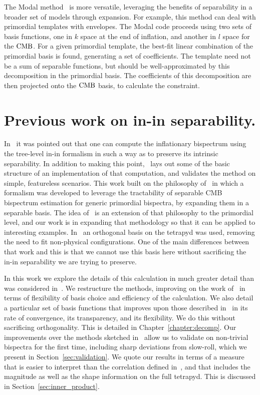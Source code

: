     The Modal method~\cite{FergShell_2014} is more versatile, 
    leveraging the benefits of separability in a broader set of models through expansion.
    For example, this method can deal with primordial templates with envelopes.
    The Modal code proceeds using two sets of basis functions, one in $k$ space at the end
    of inflation, and another in $l$ space for the $\text{CMB}$.
    For a given primordial template, the best-fit linear combination of the primordial basis
    is found, generating a set of coefficients.
    The template need not be a sum of separable functions, but should be well-approximated by this
    decomposition in the primordial basis.
    The coefficients of this decomposition are then projected onto the $\text{CMB}$ basis, to calculate the constraint.


\section{Previous work on in-in separability.}
    In~\cite{Funakoshi} it was pointed out that one can compute the inflationary
    bispectrum using the
tree-level in-in formalism in such a way as to preserve its intrinsic
separability. In addition to making this point,~\cite{Funakoshi} lays
out some of the basic structure of an implementation of that computation,
and validates the method on simple, featureless scenarios.
This work built on the philosophy of~\cite{FergShell_1,FergShell_2,FergShell_3}
in which a formalism was developed to
leverage the tractability of separable CMB bispectrum estimation
for generic primordial bispectra, by expanding them in a separable basis.
The idea of~\cite{Funakoshi} is an extension of that philosophy to the primordial level,
and our work is in expanding that methodology so that it can be applied
to interesting examples.
In~\cite{FergShell_1,FergShell_2,FergShell_3} an orthogonal basis on the tetrapyd was used,
removing the need to fit non-physical configurations.
One of the main differences between that work and this
is that we cannot use this basis here without sacrificing the
in-in separability we are trying to preserve.

In this work we explore the details of this calculation in much greater detail
than was considered in~\cite{Funakoshi}.
We restructure the methods, improving on the work of~\cite{Funakoshi} in terms
of flexibility of basis choice and efficiency of the calculation.
We also detail a particular set of basis functions that improves upon those described
in~\cite{Funakoshi} in its rate of convergence, its transparency,
and its flexibility.
We do this without sacrificing orthogonality.
This is detailed in Chapter~\ref{chapter:decomp}.
Our improvements over the methods sketched in~\cite{Funakoshi} allow us to validate
on non-trivial bispectra for the first time, including sharp deviations from slow-roll, which we present in
Section~\ref{sec:validation}.
We quote our results in terms of a measure that is
easier to interpret than the correlation defined in~\cite{Funakoshi},
and that includes the magnitude as well as the shape information
on the full tetrapyd.
This is discussed in Section~\ref{sec:inner_product}.


